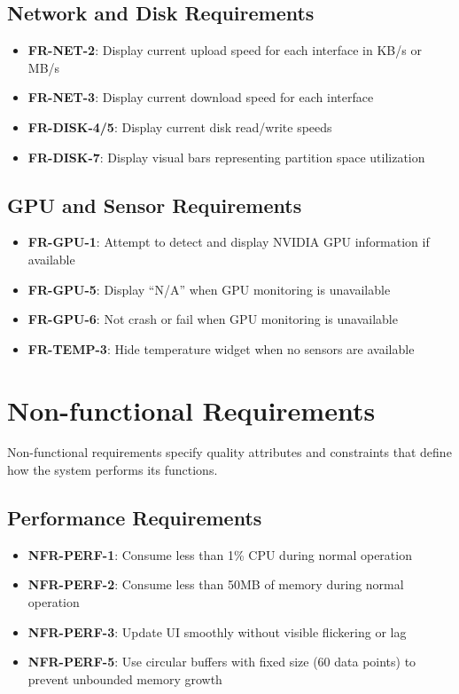 \documentclass[12pt,a4paper,oneside]{report}
\begin{document}
\subsection{Network and Disk Requirements}
\begin{itemize}
    \item \textbf{FR-NET-2}: Display current upload speed for each interface in KB/s or MB/s
    \item \textbf{FR-NET-3}: Display current download speed for each interface
    \item \textbf{FR-DISK-4/5}: Display current disk read/write speeds
    \item \textbf{FR-DISK-7}: Display visual bars representing partition space utilization
\end{itemize}

\subsection{GPU and Sensor Requirements}
\begin{itemize}
    \item \textbf{FR-GPU-1}: Attempt to detect and display NVIDIA GPU information if available
    \item \textbf{FR-GPU-5}: Display ``N/A'' when GPU monitoring is unavailable
    \item \textbf{FR-GPU-6}: Not crash or fail when GPU monitoring is unavailable
    \item \textbf{FR-TEMP-3}: Hide temperature widget when no sensors are available
\end{itemize}

\section{Non-functional Requirements}
\label{sec:non-functional-requirements}

Non-functional requirements specify quality attributes and constraints that define how the system performs its functions.

\subsection{Performance Requirements}
\begin{itemize}
    \item \textbf{NFR-PERF-1}: Consume less than 1\% CPU during normal operation
    \item \textbf{NFR-PERF-2}: Consume less than 50MB of memory during normal operation
    \item \textbf{NFR-PERF-3}: Update UI smoothly without visible flickering or lag
    \item \textbf{NFR-PERF-5}: Use circular buffers with fixed size (60 data points) to prevent unbounded memory growth
\end{itemize}
\end{document}
